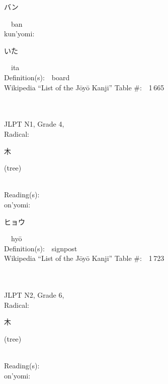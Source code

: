 \begin{multicols}{2}
{\hspace*{2em}}{\begin{CJK}{UTF8}{min} バン \end{CJK}}\ \ ban\ \ \\
{\hspace*{1em}}kun'yomi:\ \ \\
{\hspace*{2em}}{\begin{CJK}{UTF8}{min} いた \end{CJK}}\ \ ita\ \ \\
Definition(s):\ \ board \\
Wikipedia ``List of the J\=oy\=o Kanji'' Table \#:\ \ 1\,665 \\
\ \ \\
{\fontsize{34pt}{40pt}  }\ \ \\  %
{JLPT N1, Grade 4, \\Radical:\ \ {\begin{CJK}{UTF8}{min} 木 \end{CJK}} (tree) } \\
Reading(s):\ \ \\
{\hspace*{1em}}on'yomi:\ \ \\
{\hspace*{2em}}{\begin{CJK}{UTF8}{min} ヒョウ \end{CJK}}\ \ hy\=o\ \ \\
Definition(s):\ \ signpost \\
Wikipedia ``List of the J\=oy\=o Kanji'' Table \#:\ \ 1\,723 \\
\ \ \\
{\fontsize{34pt}{40pt}  }\ \ \\  %
{JLPT N2, Grade 6, \\Radical:\ \ {\begin{CJK}{UTF8}{min} 木 \end{CJK}} (tree) } \\
Reading(s):\ \ \\
{\hspace*{1em}}on'yomi:\ \ \\

\end{multicols}
